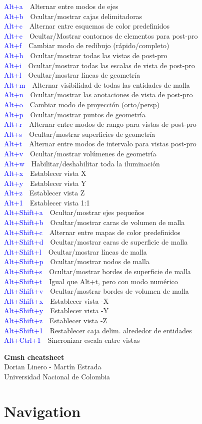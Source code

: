\documentclass[10pt, twocolumn]{article}
\newcommand{\command}[2]{\textcolor{blue}{#1}~\dotfill{}~#2\\} %
\begin{document}
\command{Alt+a}{Alternar entre modos de ejes}
\command{Alt+b}{Ocultar/mostrar cajas delimitadoras}
\command{Alt+c}{Alternar entre esquemas de color predefinidos}
\command{Alt+e}{Ocultar/Mostrar contornos de elementos para post-pro}
\command{Alt+f}{Cambiar modo de redibujo (rápido/completo)}
\command{Alt+h}{Ocultar/mostrar todas las vistas de post-pro}
\command{Alt+i}{Ocultar/mostrar todas las escalas de vista de post-pro}
\command{Alt+l}{Ocultar/mostrar líneas de geometría}
\command{Alt+m}{Alternar visibilidad de todas las entidades de malla}
\command{Alt+n}{Ocultar/mostrar las anotaciones de vista de post-pro}
\command{Alt+o}{Cambiar modo de proyección (orto/persp)}
\command{Alt+p}{Ocultar/mostrar puntos de geometría}
\command{Alt+r}{Alternar entre modos de rango para vistas de post-pro}
\command{Alt+s}{Ocultar/mostrar superficies de geometría}
\command{Alt+t}{Alternar entre modos de intervalo para vistas post-pro}
\command{Alt+v}{Ocultar/mostrar volúmenes de geometría}
\command{Alt+w}{Habilitar/deshabilitar toda la iluminación}
\command{Alt+x}{Establecer vista X}
\command{Alt+y}{Establecer vista Y}
\command{Alt+z}{Establecer vista Z}
\command{Alt+1}{Establecer vista 1:1}
\command{Alt+Shift+a}{Ocultar/mostrar ejes pequeños}
\command{Alt+Shift+b}{Ocultar/mostrar caras de volumen de malla}
\command{Alt+Shift+c}{Alternar entre mapas de color predefinidos}
\command{Alt+Shift+d}{Ocultar/mostrar caras de superficie de malla}
\command{Alt+Shift+l}{Ocultar/mostrar líneas de malla}
\command{Alt+Shift+p}{Ocultar/mostrar nodos de malla}
\command{Alt+Shift+s}{Ocultar/mostrar bordes de superficie de malla}
\command{Alt+Shift+t}{Igual que Alt+t, pero con modo numérico}
\command{Alt+Shift+v}{Ocultar/mostrar bordes de volumen de malla}
\command{Alt+Shift+x}{Establecer vista -X}
\command{Alt+Shift+y}{Establecer vista -Y}
\command{Alt+Shift+z}{Establecer vista -Z}
\command{Alt+Shift+1}{Restablecer caja delim. alrededor de entidades}
\command{Alt+Ctrl+1}{Sincronizar escala entre vistas}



\newpage 
\thispagestyle{empty} %

\begin{center}
    {\LARGE\bfseries Gmsh cheatsheet} \\ 
    {Dorian Linero - Martín Estrada} \\
    {Universidad Nacional de Colombia}
\end{center}


\section*{Navigation}
\end{document}
